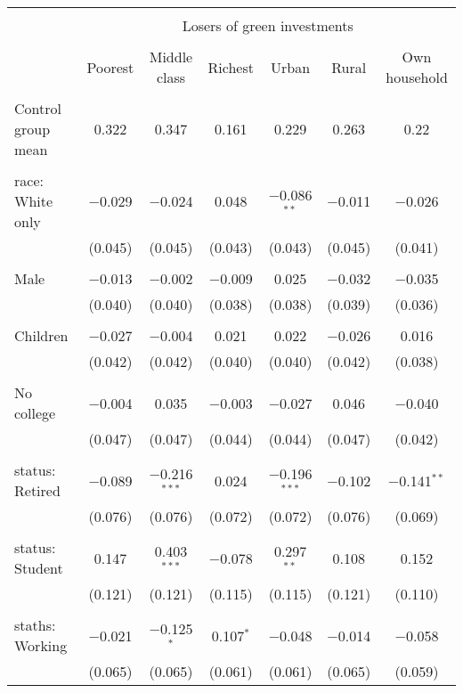
\begin{tabular}{@{\extracolsep{5pt}}lcccccc} 
\\[-1.8ex]\hline 
\hline \\[-1.8ex] 
 & \multicolumn{6}{c}{Losers of green investments} \\ 
\cline{2-7} 
\\[-1.8ex] & Poorest & Middle class & Richest & Urban & Rural & Own household \\ 
\hline \\[-1.8ex] 
 Control group mean & 0.322 & 0.347 & 0.161 & 0.229 & 0.263 & 0.22  \\ \hline \\[-1.8ex] race: White only & $-$0.029 & $-$0.024 & 0.048 & $-$0.086$^{**}$ & $-$0.011 & $-$0.026 \\ 
  & (0.045) & (0.045) & (0.043) & (0.043) & (0.045) & (0.041) \\ 
  & & & & & & \\ 
 Male & $-$0.013 & $-$0.002 & $-$0.009 & 0.025 & $-$0.032 & $-$0.035 \\ 
  & (0.040) & (0.040) & (0.038) & (0.038) & (0.039) & (0.036) \\ 
  & & & & & & \\ 
 Children & $-$0.027 & $-$0.004 & 0.021 & 0.022 & $-$0.026 & 0.016 \\ 
  & (0.042) & (0.042) & (0.040) & (0.040) & (0.042) & (0.038) \\ 
  & & & & & & \\ 
 No college & $-$0.004 & 0.035 & $-$0.003 & $-$0.027 & 0.046 & $-$0.040 \\ 
  & (0.047) & (0.047) & (0.044) & (0.044) & (0.047) & (0.042) \\ 
  & & & & & & \\ 
 status: Retired & $-$0.089 & $-$0.216$^{***}$ & 0.024 & $-$0.196$^{***}$ & $-$0.102 & $-$0.141$^{**}$ \\ 
  & (0.076) & (0.076) & (0.072) & (0.072) & (0.076) & (0.069) \\ 
  & & & & & & \\ 
 status: Student & 0.147 & 0.403$^{***}$ & $-$0.078 & 0.297$^{**}$ & 0.108 & 0.152 \\ 
  & (0.121) & (0.121) & (0.115) & (0.115) & (0.121) & (0.110) \\ 
  & & & & & & \\ 
 staths: Working & $-$0.021 & $-$0.125$^{*}$ & 0.107$^{*}$ & $-$0.048 & $-$0.014 & $-$0.058 \\ 
  & (0.065) & (0.065) & (0.061) & (0.061) & (0.065) & (0.059) \\ 

\end{tabular}
